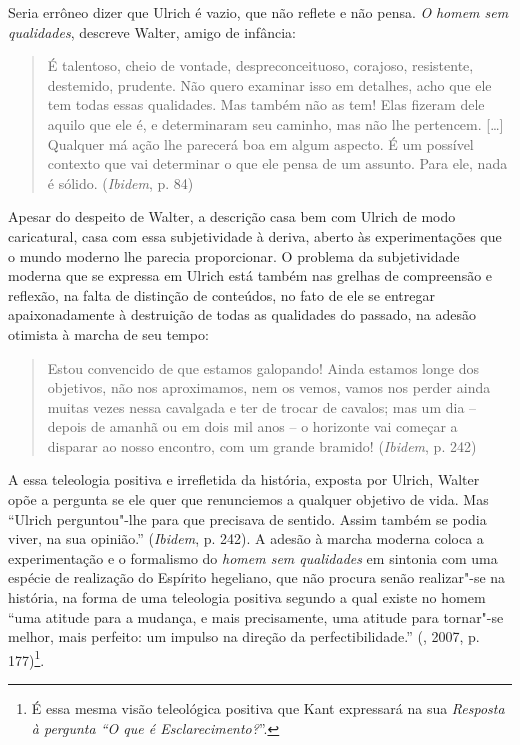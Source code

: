 Seria errôneo dizer que Ulrich é vazio, que não reflete e não pensa.
\emph{O} \emph{homem sem qualidades}, descreve Walter, amigo de
infância:

\begin{quote}
É talentoso, cheio de vontade, despreconceituoso, corajoso, resistente,
destemido, prudente. Não quero examinar isso em detalhes, acho que ele
tem todas essas qualidades. Mas também não as tem! Elas fizeram dele
aquilo que ele é, e determinaram seu caminho, mas não lhe pertencem.
[\ldots{}] Qualquer má ação lhe parecerá boa em algum aspecto. É um
possível contexto que vai determinar o que ele pensa de um assunto. Para
ele, nada é sólido. (\emph{Ibidem}, p. 84)
\end{quote}

Apesar do despeito de Walter, a descrição casa bem com Ulrich de modo
caricatural, casa com essa subjetividade à deriva, aberto às
experimentações que o mundo moderno lhe parecia proporcionar. O problema
da subjetividade moderna que se expressa em Ulrich está também nas
grelhas de compreensão e reflexão, na falta de distinção de conteúdos,
no fato de ele se entregar apaixonadamente à destruição de todas as
qualidades do passado, na adesão otimista à marcha de seu tempo:

\begin{quote}
Estou convencido de que estamos galopando! Ainda estamos longe dos
objetivos, não nos aproximamos, nem os vemos, vamos nos perder ainda
muitas vezes nessa cavalgada e ter de trocar de cavalos; mas um dia --
depois de amanhã ou em dois mil anos -- o horizonte vai começar a
disparar ao nosso encontro, com um grande bramido! (\emph{Ibidem}, p.
242)
\end{quote}

A essa teleologia positiva e irrefletida da história, exposta por
Ulrich, Walter opõe a pergunta se ele quer que renunciemos a qualquer
objetivo de vida. Mas ``Ulrich perguntou"-lhe para que precisava de
sentido. Assim também se podia viver, na sua opinião.'' (\emph{Ibidem},
p. 242). A adesão à marcha moderna coloca a experimentação e o
formalismo do \emph{homem sem qualidades} em sintonia com uma espécie de
realização do Espírito hegeliano, que não procura senão realizar"-se na
história, na forma de uma teleologia positiva segundo a qual existe no
homem ``uma atitude para a mudança, e mais precisamente, uma atitude
para tornar"-se melhor, mais perfeito: um impulso na direção da
perfectibilidade.'' (, 2007, p. 177)\footnote{É
  essa mesma visão teleológica positiva que Kant expressará na sua
  \emph{Resposta à pergunta ``O que é Esclarecimento?}''.}.


